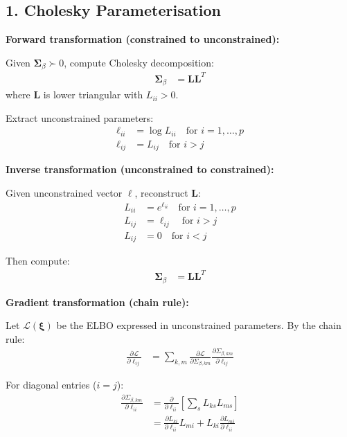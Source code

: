 \documentclass[11pt,a4paper]{article}
\begin{document}
\subsection*{1. Cholesky Parameterisation}

\textbf{Forward transformation (constrained to unconstrained):}

Given $\bm{\Sigma}_\beta \succ 0$, compute Cholesky decomposition:
\begin{align}
\bm{\Sigma}_\beta &= \bm{L}\bm{L}^T
\end{align}
where $\bm{L}$ is lower triangular with $L_{ii} > 0$.

Extract unconstrained parameters:
\begin{align}
\ell_{ii} &= \log L_{ii} \quad \text{for } i=1,\ldots,p\\
\ell_{ij} &= L_{ij} \quad \text{for } i > j
\end{align}

\textbf{Inverse transformation (unconstrained to constrained):}

Given unconstrained vector $\bm{\ell}$, reconstruct $\bm{L}$:
\begin{align}
L_{ii} &= e^{\ell_{ii}} \quad \text{for } i=1,\ldots,p\\
L_{ij} &= \ell_{ij} \quad \text{for } i > j\\
L_{ij} &= 0 \quad \text{for } i < j
\end{align}

Then compute:
\begin{align}
\bm{\Sigma}_\beta &= \bm{L}\bm{L}^T
\end{align}

\textbf{Gradient transformation (chain rule):}

Let $\mathcal{L}(\bm{\xi})$ be the ELBO expressed in unconstrained parameters. By the chain rule:
\begin{align}
\frac{\partial \mathcal{L}}{\partial \ell_{ij}} &= \sum_{k,m} \frac{\partial \mathcal{L}}{\partial \Sigma_{\beta,km}} \frac{\partial \Sigma_{\beta,km}}{\partial \ell_{ij}}
\end{align}

For diagonal entries ($i=j$):
\begin{align}
\frac{\partial \Sigma_{\beta,km}}{\partial \ell_{ii}} &= \frac{\partial}{\partial \ell_{ii}} \left[\sum_s L_{ks} L_{ms}\right]\\
&= \frac{\partial L_{ki}}{\partial \ell_{ii}} L_{mi} + L_{ki} \frac{\partial L_{mi}}{\partial \ell_{ii}}
\end{align}
\end{document}
